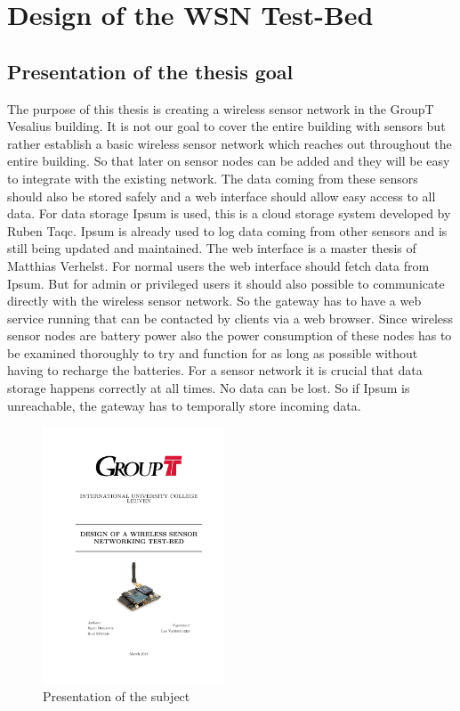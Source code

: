 \section{Design of the WSN Test-Bed}


\subsection{Presentation of the thesis goal}
The purpose of this thesis is creating a wireless sensor network in the GroupT Vesalius building. It is not our goal to cover the entire building with sensors but rather establish a basic wireless sensor network which reaches out throughout the entire building. So that later on sensor nodes can be added and they will be easy to integrate with the existing network. The data coming from these sensors should also be stored safely and a web interface should allow easy access to all data. For data storage Ipsum is used, this is a cloud storage system developed by Ruben Taqc. Ipsum is already used to log data coming from other sensors and is still being updated and maintained. The web interface is a master thesis of Matthias Verhelst. For normal users the web interface should fetch data from Ipsum. But for admin or privileged users it should also possible to communicate directly with the wireless sensor network. So the gateway has to have a web service running that can be contacted by clients via a web browser. Since wireless sensor nodes are battery power also the power consumption of these nodes has to be examined thoroughly to try and function for as long as possible without having to recharge the batteries. For a sensor network it is crucial that data storage happens correctly at all times. No data can be lost. So if Ipsum is unreachable, the gateway has to temporally store incoming data.
\begin{figure}[htbp]
\centering
\includegraphics[width=0.48\textwidth]{thesis}
\caption{Presentation of the subject}
\label{fig:thesis}
\end{figure} 





